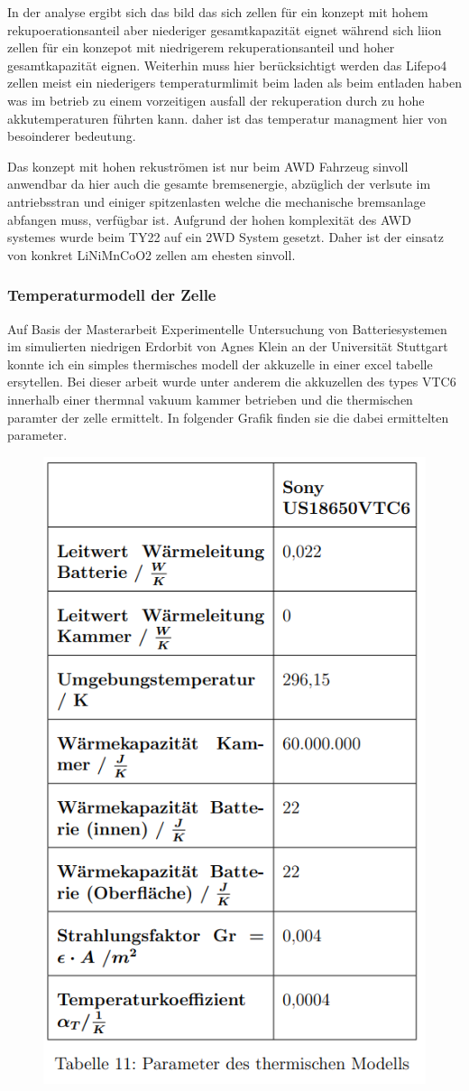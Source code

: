 In der analyse ergibt sich das bild das sich  zellen für ein konzept mit hohem rekupoerationsanteil aber niederiger gesamtkapazität eignet während sich liion zellen für ein konzepot mit niedrigerem rekuperationsanteil und hoher gesamtkapazität eignen. Weiterhin muss hier berücksichtigt werden das Lifepo4 zellen meist ein niederigers temperaturmlimit beim laden als beim entladen haben was im betrieb zu einem vorzeitigen ausfall der rekuperation durch zu hohe akkutemperaturen führten kann. daher ist das temperatur managment hier von besoinderer bedeutung.

Das konzept mit hohen rekuströmen ist nur beim AWD Fahrzeug sinvoll anwendbar da hier auch die gesamte bremsenergie, abzüglich der verlsute im antriebsstran und einiger spitzenlasten welche die mechanische bremsanlage abfangen muss, verfügbar ist. Aufgrund der hohen komplexität des AWD systemes wurde beim TY22 auf ein 2WD System gesetzt. Daher ist der einsatz von konkret LiNiMnCoO2 zellen am ehesten sinvoll.

\subsubsection{Temperaturmodell der Zelle}

Auf Basis der Masterarbeit Experimentelle Untersuchung von Batteriesystemen im simulierten niedrigen Erdorbit von Agnes Klein an der Universität Stuttgart konnte ich ein simples thermisches modell der akkuzelle in einer excel tabelle ersytellen. Bei dieser arbeit wurde unter anderem die akkuzellen des types VTC6 innerhalb einer thermnal vakuum kammer betrieben und die thermischen paramter der zelle ermittelt. In folgender Grafik finden sie die dabei ermittelten parameter.

\begin{figure}
	\centering
	\includegraphics[width=0.4\linewidth]{bilder/Parameter_thermisches_modell_VTC6}
	\caption{}
	\label{fig:parameterthermischesmodellvtc6}
\end{figure}


